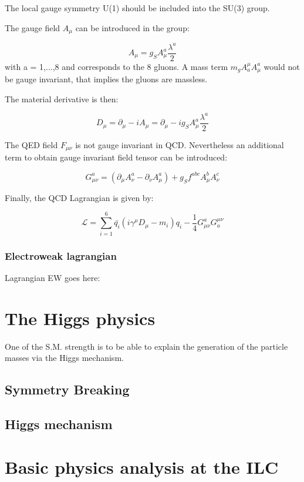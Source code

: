     The local gauge symmetry U(1) should be included into the SU(3) group.
    
    The gauge field $A_{\mu}$ can be introduced in the group:
    
    \begin{equation}
        A_{\mu} = g_S A^a_{\mu}\frac{\lambda^a}{2}
    \end{equation} 
    with a = 1,...,8 and corresponds to the 8 gluons.
    A mass term  $m_g A^{\mu}_a A^a_{\mu}$ would not be gauge invariant, that implies the gluons are massless.

    The material derivative is then:

    \begin{equation}
        D_{\mu} = \partial_{\mu} - i A_{\mu} = \partial_{\mu} - i g_S A^a_{\mu} \frac{\lambda^a}{2}
    \end{equation}

    The QED field $F_{\mu \nu}$ is not gauge invariant in QCD.
    Nevertheless an additional term to obtain gauge invariant field tensor can be introduced:
    
    \begin{equation}
        G^a_{\mu \nu} = \left( \partial_{\mu} A^a_{\nu} - \partial_{\nu} A^a_{\mu} \right) + g_S f^{abc} A^b_{\mu} A^c_{\nu}
    \end{equation} 

    Finally, the QCD Lagrangian is given by:

    \begin{equation}
        \mathcal{L} = \sum_{i=1}^6  \bar{q_i} \left(i \gamma^{\mu}D_{\mu} -m_i \right)q_i - \frac{1}{4} G_{\mu \nu}^{a} G_{a}^{\mu \nu}
    \end{equation}
    
    \subsubsection{Electroweak lagrangian}
   
    Lagrangian EW goes here: 

  \section{The Higgs physics}

	One of the S.M. strength is to be able to explain the generation of the particle masses via the Higgs mechanism.
   
    \subsection{Symmetry Breaking}

    \subsection{Higgs mechanism}

  \section{Basic physics analysis at the ILC}


